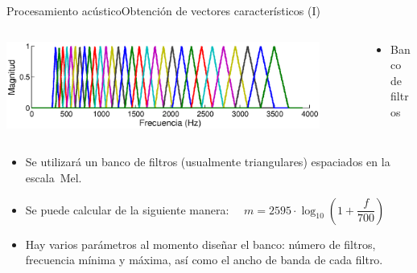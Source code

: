 \begin{frame}{Procesamiento acústico}{Obtención de vectores característicos (I)}
  \small {
  \vspace{0mm} 
  \begin{columns}   
    \begin{column}{0.6\textwidth} 
      \hfill  
      \includegraphics[width=0.9\textwidth]{gfx/example_mfcc}    
    \end{column}
    \begin{column}{0.4\textwidth}
      \vspace{-8mm} 
      \begin{itemize}
        \setlength{\itemindent}{-2em}      
        \itemsep 4.6em    
        \item Banco de filtros
      \end{itemize}
    \end{column}   
  \end{columns}   
  }
  \vspace{1.5em}
  \begin{itemize}
    \itemsep1em
    \item Se utilizará un banco de filtros (usualmente triangulares) espaciados en la escala~Mel. 

    \item Se puede calcular de la siguiente manera:~~ $m = 2595 \cdot \log_{10} \left(1 + \dfrac{f}{700}\right)$

    \item Hay varios parámetros al momento diseñar el banco: número de filtros, frecuencia mínima y máxima, así como el ancho de banda de cada filtro.
  \end{itemize}
\end{frame}

